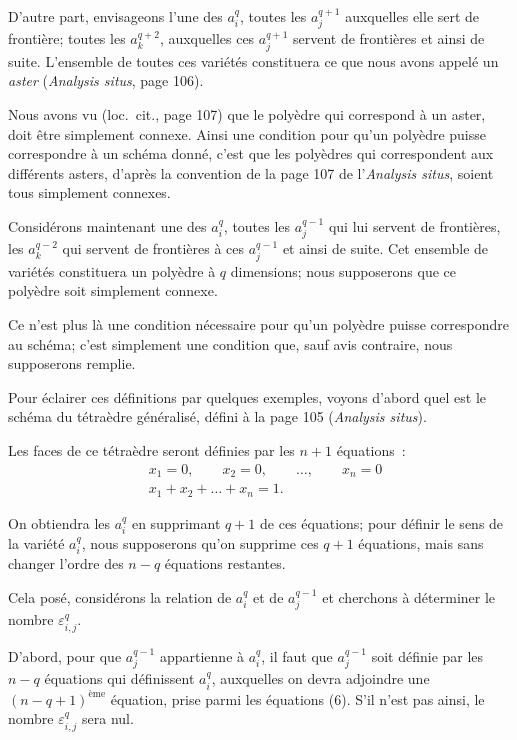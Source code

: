 \documentclass{article}
\begin{document}

D'autre part, envisageons l'une des $a^{q}_{i}$, toutes les $a^{q+1}_{j}$ auxquelles elle sert de frontière; toutes les $a^{q+2}_{k}$, auxquelles ces $a^{q+1}_{j}$ servent de frontières et ainsi de suite. L'ensemble de toutes ces variétés constituera ce que nous avons appelé un \emph{aster} (\emph{Analysis situs}, page 106).

Nous avons vu (loc.\ cit., page 107) que le polyèdre qui correspond à un aster, doit être simplement connexe. Ainsi une condition pour qu'un polyèdre puisse correspondre à un schéma donné, c'est que les polyèdres qui correspondent aux différents asters, d'après la convention de la page 107 de l'\emph{Analysis situs}, soient tous simplement connexes.

Considérons maintenant une des $a^{q}_{i}$, toutes les $a^{q-1}_{j}$ qui lui servent de frontières, les $a^{q-2}_{k}$ qui servent de frontières à ces $a^{q-1}_{j}$ et ainsi de suite. Cet ensemble de variétés constituera un polyèdre à $q$ dimensions; nous supposerons que ce polyèdre soit simplement connexe.

Ce n'est plus là une condition nécessaire pour qu'un polyèdre puisse correspondre au schéma; c'est simplement une condition que, sauf avis contraire, nous supposerons remplie.

Pour éclairer ces définitions par quelques exemples, voyons d'abord quel est le schéma du tétraèdre généralisé, défini à la page 105 (\emph{Analysis situs}).

Les faces de ce tétraèdre seront définies par les $n+1$ équations~:
\[ \begin{aligned} &x_{1} = 0, \qquad x_{2} = 0, \qquad \ldots, \qquad x_{n} = 0\\ &x_{1} + x_{2} + \ldots + x_{n} = 1. \end{aligned} \tag{6} \]

On obtiendra les $a^{q}_{i}$ en supprimant $q+1$ de ces équations; pour définir le sens de la variété $a^{q}_{i}$, nous supposerons qu'on supprime ces $q+1$ équations, mais sans changer l'ordre des $n-q$ équations restantes.

Cela posé, considérons la relation de $a^{q}_{i}$ et de $a^{q-1}_{j}$ et cherchons à déterminer le nombre $\varepsilon^{q}_{i,j}$.

D'abord, pour que $a^{q-1}_{j}$ appartienne à $a^{q}_{i}$, il faut que $a^{q-1}_{j}$ soit définie par les $n-q$ équations qui définissent $a^{q}_{i}$, auxquelles on devra adjoindre une $(n-q+1)^{\text{ème}}$ équation, prise parmi les équations (6). S'il n'est pas ainsi, le nombre $\varepsilon^{q}_{i,j}$ sera nul.
\end{document}
